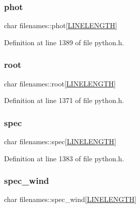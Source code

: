 \subsubsection{\texorpdfstring{phot}{phot}}
{\footnotesize\ttfamily char filenames\+::phot\mbox{[}\hyperlink{xlog_8c_a10e8c7b8458375c3dbfbb4010a2aba8c}{L\+I\+N\+E\+L\+E\+N\+G\+TH}\mbox{]}}



Definition at line 1389 of file python.\+h.

\mbox{\label{structfilenames_a8c053bab321640d4f0f5b75110980c89}} 
\subsubsection{\texorpdfstring{root}{root}}
{\footnotesize\ttfamily char filenames\+::root\mbox{[}\hyperlink{xlog_8c_a10e8c7b8458375c3dbfbb4010a2aba8c}{L\+I\+N\+E\+L\+E\+N\+G\+TH}\mbox{]}}



Definition at line 1371 of file python.\+h.

\mbox{\label{structfilenames_a1532ac6d7bebce60d86774d552e0c078}} 
\subsubsection{\texorpdfstring{spec}{spec}}
{\footnotesize\ttfamily char filenames\+::spec\mbox{[}\hyperlink{xlog_8c_a10e8c7b8458375c3dbfbb4010a2aba8c}{L\+I\+N\+E\+L\+E\+N\+G\+TH}\mbox{]}}



Definition at line 1383 of file python.\+h.

\mbox{\label{structfilenames_a4e7d0693cd2c2a7359a840d8649a75c1}} 
\subsubsection{\texorpdfstring{spec\+\_\+wind}{spec\_wind}}
{\footnotesize\ttfamily char filenames\+::spec\+\_\+wind\mbox{[}\hyperlink{xlog_8c_a10e8c7b8458375c3dbfbb4010a2aba8c}{L\+I\+N\+E\+L\+E\+N\+G\+TH}\mbox{]}}




